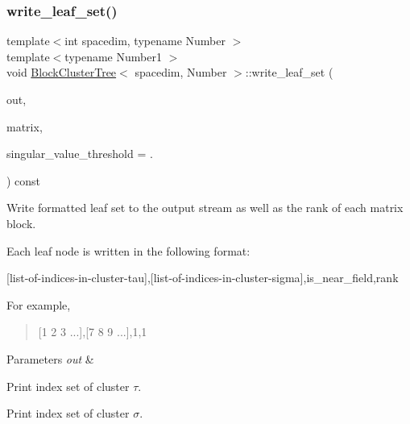 \mbox{\label{classBlockClusterTree_a652b1c53dff2794e2f18343bf3988e19}} 
\subsubsection{\texorpdfstring{write\+\_\+leaf\+\_\+set()}{write\_leaf\_set()}\hspace{0.1cm}{\footnotesize\ttfamily [2/2]}}
{\footnotesize\ttfamily template$<$int spacedim, typename Number $>$ \\
template$<$typename Number1 $>$ \\
void \hyperlink{classBlockClusterTree}{Block\+Cluster\+Tree}$<$ spacedim, Number $>$\+::write\+\_\+leaf\+\_\+set (\begin{DoxyParamCaption}\item[{std\+::ostream \&}]{out,  }\item[{const \hyperlink{classLAPACKFullMatrixExt}{L\+A\+P\+A\+C\+K\+Full\+Matrix\+Ext}$<$ Number1 $>$ \&}]{matrix,  }\item[{const Number1}]{singular\+\_\+value\+\_\+threshold = {.} }\end{DoxyParamCaption}) const}

Write formatted leaf set to the output stream as well as the rank of each matrix block.

Each leaf node is written in the following format\+:

\begin{quote}


\end{quote}
\mbox{[}list-\/of-\/indices-\/in-\/cluster-\/tau\mbox{]},\mbox{[}list-\/of-\/indices-\/in-\/cluster-\/sigma\mbox{]},is\+\_\+near\+\_\+field,rank

For example,

\begin{quote}
\mbox{[}1 2 3 ...\mbox{]},\mbox{[}7 8 9 ...\mbox{]},1,1 \end{quote}

\begin{DoxyParams}{Parameters}
{\em out} & \\
\hline
\end{DoxyParams}
Print index set of cluster $\tau$.

Print index set of cluster $\sigma$.

